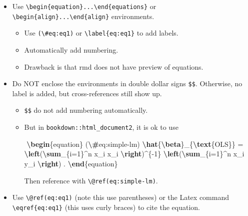 \documentclass[
  a4paper,
  twoside,
  openright]{book}
\newenvironment{Shaded}{\begin{snugshade}}{\end{snugshade}}
\newcommand{\ExtensionTok}[1]{#1}
\newcommand{\KeywordTok}[1]{\textcolor[rgb]{0.13,0.29,0.53}{\textbf{#1}}}
\newcommand{\NormalTok}[1]{#1}
\newcommand{\SpecialCharTok}[1]{\textcolor[rgb]{0.81,0.36,0.00}{\textbf{#1}}}
\newcommand{\SpecialStringTok}[1]{\textcolor[rgb]{0.31,0.60,0.02}{#1}}
\providecommand{\tightlist}{%
  \setlength{\itemsep}{0pt}\setlength{\parskip}{0pt}}
\theoremstyle{definition}
\theoremstyle{definition}
\theoremstyle{definition}
\theoremstyle{definition}
\theoremstyle{remark}
\begin{document}
\begin{itemize}
\item
  Use \texttt{\textbackslash{}begin\{equation\}...\textbackslash{}end\{equations\}} or \texttt{\textbackslash{}begin\{align\}...\textbackslash{}end\{align\}} environments.

  \begin{itemize}
  \tightlist
  \item
    Use \texttt{(\textbackslash{}\#eq:eq1)} or \texttt{\textbackslash{}label\{eq:eq1\}} to add labels.
  \item
    Automatically add numbering.
  \item
    Drawback is that rmd does not have preview of equations.
  \end{itemize}
\item
  Do NOT enclose the environments in double dollar signs \texttt{\$\$}. Otherwise, no label is added, but cross-references still show up.

  \begin{itemize}
  \item
    \texttt{\$\$} do not add numbering automatically.
  \item
    But in \texttt{bookdown::html\_document2}, it is ok to use

\begin{Shaded}
\begin{Highlighting}[]
\SpecialStringTok{$$}
\KeywordTok{\textbackslash{}begin}\NormalTok{\{}\ExtensionTok{equation}\NormalTok{\}}\SpecialStringTok{ (}\SpecialCharTok{\textbackslash{}\#}\SpecialStringTok{eq:simple{-}lm)}
\SpecialCharTok{\textbackslash{}hat}\SpecialStringTok{\{}\SpecialCharTok{\textbackslash{}beta}\SpecialStringTok{\}\_\{}\SpecialCharTok{\textbackslash{}text}\NormalTok{\{OLS\}}\SpecialStringTok{\} = }\SpecialCharTok{\textbackslash{}left}\SpecialStringTok{(}\SpecialCharTok{\textbackslash{}sum}\SpecialStringTok{\_\{i=1\}\^{}n x\_i x\_i\textquotesingle{} }\SpecialCharTok{\textbackslash{}right}\SpecialStringTok{)\^{}\{{-}1\} }\SpecialCharTok{\textbackslash{}left}\SpecialStringTok{(}\SpecialCharTok{\textbackslash{}sum}\SpecialStringTok{\_\{i=1\}\^{}n x\_i y\_i }\SpecialCharTok{\textbackslash{}right}\SpecialStringTok{) .}
\KeywordTok{\textbackslash{}end}\NormalTok{\{}\ExtensionTok{equation}\NormalTok{\}}
\SpecialStringTok{$$}
\end{Highlighting}
\end{Shaded}

    Then reference with \texttt{\textbackslash{}@ref(eq:simple-lm)}.
  \end{itemize}
\item
  Use \texttt{\textbackslash{}@ref(eq:eq1)} (note this use parentheses) or the Latex command \texttt{\textbackslash{}eqref\{eq:eq1\}} (this uses curly braces) to cite the equation.
\end{itemize}
\end{document}
